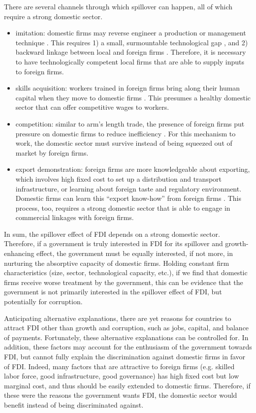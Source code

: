 There are several channels through which spillover can happen, all of which require a strong domestic sector.
\begin{itemize}
	\item imitation:  domestic firms may reverse engineer a production or management technique \citep{Wang1992}. This requires 1) a small, surmountable technological gap \citep{Kokko1996}, and 2) backward linkage between local and foreign firms \citep{Javorcik2004}. Therefore, it is necessary to have technologically competent local firms that are able to supply inputs to foreign firms.
	\item skills acquisition: workers trained in foreign firms bring along their human capital when they move to domestic firms \citep{Djankov2000}. This presumes a healthy domestic sector that can offer competitive wages to workers. 
	\item competition: similar to arm's length trade, the presence of foreign firms put pressure on domestic firms to reduce inefficiency \citep{Glass2002}. For this mechanism to work, the domestic sector must survive instead of being squeezed out of market by foreign firms.
	\item export demonstration: foreign firms are more knowledgeable about exporting, which involves high fixed cost to set up a distribution and transport infrastructure, or learning about foreign taste and regulatory environment. Domestic firms can learn this ``export know-how'' from foreign firms \citep{Aitken1997}. This process, too, requires a strong domestic sector that is able to engage in commercial linkages with foreign firms.
\end{itemize}

In sum, the spillover effect of FDI depends on a strong domestic sector. Therefore, if a government is truly interested in FDI for its spillover and growth-enhancing effect, the government must be equally interested, if not more, in nurturing the absorptive capacity of domestic firms. Holding constant firm characteristics (size, sector, technological capacity, etc.), if we find that domestic firms receive worse treatment by the government, this can be evidence that the government is not primarily interested in the spillover effect of FDI, but potentially for corruption.

Anticipating alternative explanations, there are yet reasons for countries to attract FDI other than growth and corruption, such as jobs, capital, and balance of payments. Fortunately, these alternative explanations can be controlled for. In addition, these factors may account for the enthusiasm of the government towards FDI, but cannot fully explain the discrimination against domestic firms in favor of FDI. Indeed, many factors that are attractive to foreign firms (e.g. skilled labor force, good infrastructure, good governance) has high fixed cost but low marginal cost, and thus should be easily extended to domestic firms. Therefore, if these were the reasons the government wants FDI, the domestic sector would benefit instead of being discriminated against.

